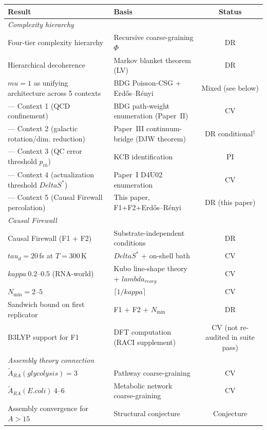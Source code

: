 \documentclass[11pt]{article}
\def\Delta{Delta}%
\def\mu{mu}%
\def\tau{tau}%
\def\kappa{kappa}%
\def\lambda{lambda}%
\def\mathrm#1{#1}%
\def\text#1{#1}%
\def\approx{~}%
\begin{document}
\begin{center}
\begin{tabular}{llc}
\toprule
Result & Basis & Status \\
\midrule
\multicolumn{3}{l}{\textit{Complexity hierarchy}} \\
Four-tier complexity hierarchy & Recursive coarse-graining $\Phi$ & DR \\
Hierarchical decoherence & Markov blanket theorem (LV) & DR \\
$\mu=1$ as unifying architecture across 5 contexts & BDG Poisson-CSG + Erd\H{o}s--R\'enyi & Mixed (see below) \\
\quad — Context 1 (QCD confinement) & BDG path-weight enumeration (Paper~II) & CV \\
\quad — Context 2 (galactic rotation/dim. reduction) & Paper~III continuum-bridge (DJW theorem) & DR conditional$^\dagger$ \\
\quad — Context 3 (QC error threshold $p_{\mathrm{th}}$) & KCB identification & PI \\
\quad — Context 4 (actualization threshold $\Delta S^*$) & Paper~I D4U02 enumeration & CV \\
\quad — Context 5 (Causal Firewall percolation) & This paper, F1+F2+Erd\H{o}s--R\'enyi & DR (this paper) \\
\midrule
\multicolumn{3}{l}{\textit{Causal Firewall}} \\
Causal Firewall (F1 + F2) & Substrate-independent conditions & DR \\
$\tau_d=20$\,fs at $T=300$\,K & $\Delta S^*$ + on-shell bath & CV \\
$\kappa\approx 0.2$--$0.5$ (RNA-world) & Kubo line-shape theory + $\lambda_{\mathrm{reorg}}$ & CV \\
$N_{\min}=2$--$5$ & $\lceil 1/\kappa\rceil$ & CV \\
Sandwich bound on first replicator & F1 + F2 + $N_{\min}$ & DR \\
B3LYP support for F1 & DFT computation (RACI supplement) & CV (not re-audited in suite pass) \\
\midrule
\multicolumn{3}{l}{\textit{Assembly theory connection}} \\
$\tilde{A}_{\mathrm{RA}}(\text{glycolysis})=3$ & Pathway coarse-graining & CV \\
$\tilde{A}_{\mathrm{RA}}(\text{E. coli})\approx 4$--$6$ & Metabolic network coarse-graining & CV \\
Assembly convergence for $A>15$ & Structural conjecture & Conjecture \\

\end{tabular}
\end{center}
\end{document}
